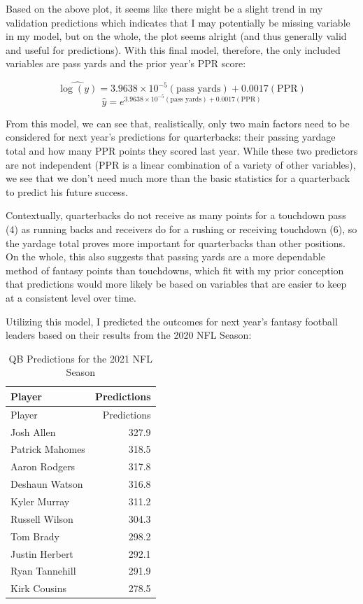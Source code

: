 \documentclass[
]{article}
\begin{document}
Based on the above plot, it seems like there might be a slight trend in
my validation predictions which indicates that I may potentially be
missing variable in my model, but on the whole, the plot seems alright
(and thus generally valid and useful for predictions). With this final
model, therefore, the only included variables are pass yards and the
prior year's PPR score:

\[
\hat{\log(y)}= \ensuremath{3.9638\times 10^{-5}}(\text{pass yards}) + 0.0017(\text{PPR})
\] \[
\hat{y}= e^{\ensuremath{3.9638\times 10^{-5}}(\text{pass yards}) + 0.0017(\text{PPR})}
\]

From this model, we can see that, realistically, only two main factors
need to be considered for next year's predictions for quarterbacks:
their passing yardage total and how many PPR points they scored last
year. While these two predictors are not independent (PPR is a linear
combination of a variety of other variables), we see that we don't need
much more than the basic statistics for a quarterback to predict his
future success.

Contextually, quarterbacks do not receive as many points for a touchdown
pass (4) as running backs and receivers do for a rushing or receiving
touchdown (6), so the yardage total proves more important for
quarterbacks than other positions. On the whole, this also suggests that
passing yards are a more dependable method of fantasy points than
touchdowns, which fit with my prior conception that predictions would
more likely be based on variables that are easier to keep at a
consistent level over time.

Utilizing this model, I predicted the outcomes for next year's fantasy
football leaders based on their results from the 2020 NFL Season:

\begin{longtable}[]{@{}lr@{}}
\caption{QB Predictions for the 2021 NFL Season}\tabularnewline
\toprule
Player & Predictions \\
\midrule
\endfirsthead
\toprule
Player & Predictions \\
\midrule
\endhead
Josh Allen & 327.9 \\
Patrick Mahomes & 318.5 \\
Aaron Rodgers & 317.8 \\
Deshaun Watson & 316.8 \\
Kyler Murray & 311.2 \\
Russell Wilson & 304.3 \\
Tom Brady & 298.2 \\
Justin Herbert & 292.1 \\
Ryan Tannehill & 291.9 \\
Kirk Cousins & 278.5 \\
\bottomrule
\end{longtable}
\end{document}
